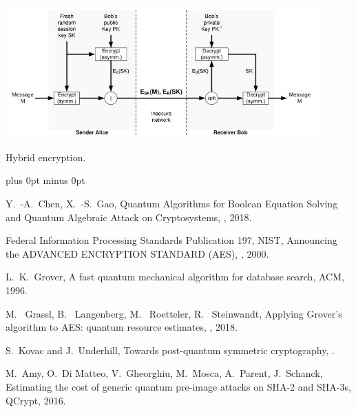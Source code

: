 \documentclass[a4paper,11pt]{article}
\begin{document}
\begin{otherlanguage}{english}
\begin{figurehere}
  \centering
  \includegraphics[width=12cm]{hybrid-encryption.jpg}
  \caption{Hybrid encryption.\label{abb_2}}
\end{figurehere}

\vspace{0.3cm} 






\begin{thebibliography}{1}
\itemsep=0cm plus 0pt minus 0pt

Y.~-A.~Chen, X.~-S.~Gao,
  \newblock Quantum Algorithms for Boolean Equation Solving and Quantum Algebraic Attack on Cryptosystems,
  , 2018.

Federal Information Processing Standards Publication 197, NIST,
  \newblock Announcing the ADVANCED ENCRYPTION STANDARD (AES),
  , 2000.

L.~K.~Grover,
  \newblock A fast quantum mechanical algorithm for database search, 
   ACM, 1996.

M.~ Grassl, B.~ Langenberg, M.~ Roetteler, R.~ Steinwandt,
  \newblock Applying Grover’s algorithm to AES: quantum resource estimates,
  , 2018.

S.~Kovac and J.~Underhill,
  \newblock Towards post-quantum symmetric cryptography,
  .

M.~Amy, O.~Di Matteo, V.~Gheorghiu, M.~Mosca, A.~Parent, J.~Schanck,
  \newblock Estimating the cost of generic quantum pre-image attacks on SHA-2 and SHA-3s, 
   QCrypt, 2016.


\end{thebibliography}
\end{otherlanguage}
\end{document}
